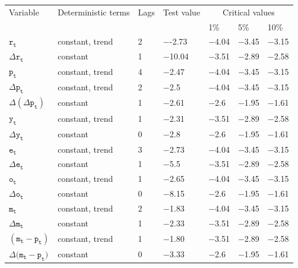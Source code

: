 \documentclass[11pt,preprint, authoryear]{elsarticle}
\let\origtable\table
\let\endorigtable\endtable
\renewenvironment{table}[1][2] {
    \expandafter\origtable\expandafter[H]
} {
    \endorigtable
}
\numberwithin{equation}{section}
\numberwithin{figure}{section}
\numberwithin{table}{section}
\begin{document}
\begin{table}
\caption{ADF~Tests for Unit Roots and Order of Integration.}
\begin{center}
\begin{tabular}{@{}lllllll@{}}
\toprule
\multicolumn{1}{l}{Variable}&
\multicolumn{1}{l}{Deterministic terms}&
\multicolumn{1}{l}{Lags}&
\multicolumn{1}{l}{Test value} &
\multicolumn{3}{c}{Critical values}
\\
\cmidrule(l){5-7}
& & & & 1\% & 5\% & 10\%\\
\midrule    
$\mathtt{r_t}$ & constant, trend & 2 & $-$-2.73 &
$-$4.04 & $-$3.45 & $-$3.15\\ 
$\varDelta \mathtt{r_t}$ & constant & 1 & $-$10.04 &
$-$3.51 & $-$2.89 & $-$2.58\\ 
$\mathtt{p_t}$ & constant, trend & 4 & $-$2.47 &
$-$4.04 & $-$3.45 & $-$3.15\\ 
$\varDelta \mathtt{p_t}$ & constant, trend & 2 & $-$2.5 &
$-$4.04 & $-$3.45 & $-$3.15\\ 
$\varDelta(\varDelta \mathtt{p_t})$ & constant & 1 & $-$2.61 &
$-$2.6 & $-$1.95 & $-$1.61\\  
$\mathtt{y_t}$ & constant, trend & 1 & $-$2.31 &
$-$3.51 & $-$2.89 & $-$2.58\\  
$\varDelta\mathtt{y_t}$ & constant & 0 & $-$2.8 &
$-$2.6 & $-$1.95 & $-$1.61\\ 
$ \mathtt{e_t}$ & constant, trend & 3 & $-$2.73 &
$-$4.04 & $-$3.45 & $-$3.15\\  
$\varDelta \mathtt{e_t}$ & constant & 1 & $-$5.5 &
$-$3.51 & $-$2.89 & $-$2.58\\ 
$\mathtt{o_t}$ & constant, trend & 1 & $-$2.65 &
$-$4.04 & $-$3.45 & $-$3.15\\ 
$\varDelta \mathtt{o_t}$ & constant & 0 & $-$8.15 &
$-$2.6 & $-$1.95 & $-$1.61\\ 
$\mathtt{m_t}$ & constant, trend & 2 & $-$1.83 &
$-$4.04 & $-$3.45 & $-$3.15\\ 
$\varDelta \mathtt{m_t}$ & constant & 1 & $-$2.33 &
$-$3.51 & $-$2.89 & $-$2.58\\ 
$(\mathtt{m_t-p_t})$ & constant, trend & 1 & $-$1.80 &
$-$3.51 & $-$2.89 & $-$2.58\\ 
$\varDelta (\mathtt{m_t - p_t)}$ & constant & 0 & $-$3.33 &
$-$2.6 & $-$1.95 & $-$1.61\\
\bottomrule
\end{tabular}
\end{center}
\label{tab-2}
\end{table}
\end{document}
